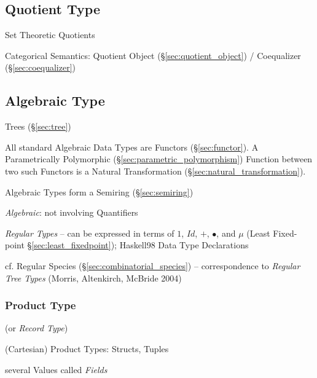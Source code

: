 


\subsection{Quotient Type}\label{sec:quotient_type}\hfill

Set Theoretic Quotients

Categorical Semantics: Quotient Object (\S\ref{sec:quotient_object}) /
Coequalizer (\S\ref{sec:coequalizer})



\subsection{Algebraic Type}\label{sec:algebraic_type}

Trees (\S\ref{sec:tree})

All standard Algebraic Data Types are Functors (\S\ref{sec:functor}). A
Parametrically Polymorphic (\S\ref{sec:parametric_polymorphism}) Function
between two such Functors is a Natural Transformation
(\S\ref{sec:natural_transformation}).

Algebraic Types form a Semiring (\S\ref{sec:semiring})

\emph{Algebraic}: not involving Quantifiers %

\emph{Regular Types} -- can be expressed in terms of $1$, $Id$, $+$, $\bullet$,
and $\mu$ (Least Fixed-point \S\ref{sec:least_fixedpoint}); Haskell98 Data Type
Declarations

cf. Regular Species (\S\ref{sec:combinatorial_species}) -- correspondence to
\emph{Regular Tree Types} (Morris, Altenkirch, McBride 2004)



\subsubsection{Product Type}\label{sec:product_type}

(or \emph{Record Type})

(Cartesian) Product Types: Structs, Tuples

several Values called \emph{Fields}


